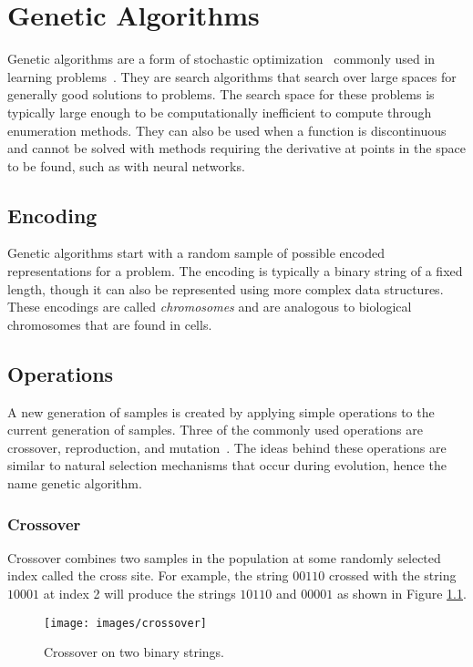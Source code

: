 \chapter[Genetic Algorithms]{Genetic Algorithms}
Genetic algorithms are a form of stochastic optimization~\cite{stochastic} commonly used
in learning problems~\cite{ga1,ga2,ga3}.
They are search algorithms that search over large spaces for generally good solutions to problems.
The search space for these problems is typically large enough to be computationally inefficient to compute through enumeration methods.
They can also be used when a function is discontinuous and cannot be
solved with methods requiring the derivative at points in the
space to be found, such as with neural networks.

\section{Encoding}
Genetic algorithms start with a random sample of possible encoded representations for a problem.
The encoding is typically a binary string of a fixed length, though it can also be represented using more complex data structures.
These encodings are called {\it chromosomes} and are analogous to biological chromosomes that are found in cells.

\section{Operations}
A new generation of samples is created by applying simple operations to the current generation of samples. 
Three of the commonly used operations are crossover, reproduction, and
mutation~\cite[62-65]{goldberg}.
The ideas behind these operations are similar to natural selection mechanisms that occur during evolution, hence the name genetic algorithm. 

\subsection{Crossover}
Crossover combines two samples in the population at some randomly selected index called the cross site. 
For example, the string $00110$ crossed with the string $10001$ at index 2 will produce the strings $10110$ and $00001$ as shown in Figure \ref{crossover}.

\begin{figure}[h!]
  \centering
  \texttt{[image: images/crossover]}
  \caption{Crossover on two binary strings.}
  \label{crossover}
\end{figure}

